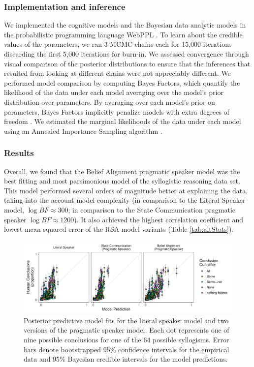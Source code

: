 \documentclass[floatsintext, doc]{apa6}
\begin{document}
\subsubsection{Implementation and inference}

We implemented the cognitive models and the Bayesian data analytic models in the probabilistic programming language WebPPL \cite{dippl}. 
To learn about the credible values of the parameters, we ran 3 MCMC chains each for 15,000 iterations discarding the first 5,000 iterations for burn-in. 
We assessed convergence through visual comparison of the posterior distributions to ensure that the inferences that resulted from looking at different chains were not appreciably different.
We performed model comparison by computing Bayes Factors, which quantify the likelihood of the data under each model averaging over the model's prior distribution over parameters. By averaging over each model's prior on parameters, Bayes Factors implicitly penalize models with extra degrees of freedom \cite{lee2014bayesian}.
We estimated the marginal likelihoods of the data under each model using an Annealed Importance Sampling algorithm \cite{neal2001annealed}.

\subsubsection{Results}

Overall, we found that the Belief Alignment pragmatic speaker model was the best fitting and most parsimonious model of the syllogistic reasoning data set. 
This model performed several orders of magnitude better at explaining the data, taking into the account model complexity (in comparison to the Literal Speaker model, $\log BF \approx 300$; in comparison to the State Communication pragmatic speaker $\log BF \approx 1200$).
It also achieved the highest correlation coefficient and lowest mean squared error of the RSA model variants (Table \ref{tab:altStats}).

\begin{figure}[t]
\centering
\includegraphics[width = \textwidth]{figs/bda_rsa_scatters_0paramPrior.pdf}
\caption{Posterior predictive model fits for the literal speaker model and two versions of the pragmatic speaker model. Each dot represents one of nine possible conclusions for one of the 64 possible syllogisms. Error bars denote bootstrapped 95\% confidence intervals for the empirical data and 95\% Bayesian credible intervals for the model predictions.}
\label{fig:scatters}
\end{figure}
\end{document}
